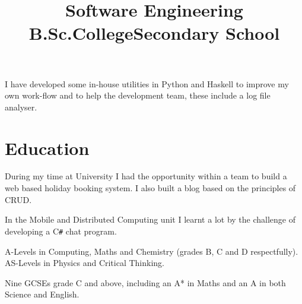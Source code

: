 \documentclass[line,margin]{res}
\newcommand{\CSharp}{C\texttt{\#}}
\begin{document}
\begin{resume}
\begin{position}
I have developed some in-house utilities in Python and Haskell to improve my own work-flow and to help the development team, these include a log file analyser.
\end{position}

\section{Education}

\title{Software Engineering B.Sc.} %
\begin{position}
During my time at University I had the opportunity within a team to build a web based holiday booking system.
I also built a blog based on the principles of CRUD.

In the Mobile and Distributed Computing unit I learnt a lot by the challenge of developing a {\CSharp} chat program.
\end{position}

\title{College}
\begin{position}
A-Levels in Computing, Maths and Chemistry (grades B, C and D respectfully). \\
AS-Levels in Physics and Critical Thinking.

\begin{comment}
\begin{tabular}{ l r r }
	Computing & A Level & B \\
	Maths & A Level & C \\
	Chemistry & A Level & D \\
	Physics & AS Level & D \\
	Critical Thinking & AS Level & E \\
\end{tabular}
\end{comment}
\end{position}

\title{Secondary School}
\begin{position}
Nine GCSEs grade C and above, including an A* in Maths and an A in both Science and English.


\end{position}
\end{resume}
\end{document}
